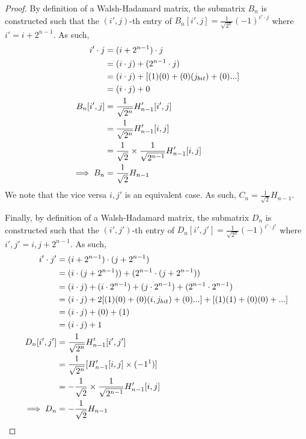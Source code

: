\documentclass[11pt]{article}
\theoremstyle{definition}
\theoremstyle{plain}
\theoremstyle{indented-remark}
\theoremstyle{indented-proof}
\begin{document}
\begin{proof}
\noindent By definition of a Walsh-Hadamard matrix, the submatrix $B_{n}$ is constructed such that the $(i',j)$-th entry of 
$B_{n}[i',j] = \frac{1}{\sqrt{2^{n}}}(-1)^{i' \cdot j}$ where $i' = i + 2^{n-1}$. As such,
\begin{align}
i' \cdot j &= (i + 2^{n-1}) \cdot j\notag \\
&= (i \cdot j) + (2^{n-1} \cdot j)\notag \\
&= (i \cdot j) + [(1)(0) + (0)(j_{bit}) + (0)...]\notag \\
&= (i \cdot j) + 0\notag \\
\newline
B_{n}[i',j] &= \frac{1}{\sqrt{2^{n}}}H'_{n-1}[i',j]\notag \\
&= \frac{1}{\sqrt{2^{n}}}H'_{n-1}[i,j]\notag \\
&= \frac{1}{\sqrt{2}} \times \frac{1}{\sqrt{2^{n-1}}}H'_{n-1}[i,j]\notag \\
\implies B_{n} &= \frac{1}{\sqrt{2}}H_{n-1}\notag
\end{align}
\noindent We note that the vice versa $i,j'$ is an equivalent case. As such, 
$C_{n} = \frac{1}{\sqrt{2}}H_{n-1}$. \newline

\noindent Finally, by definition of a Walsh-Hadamard matrix, the submatrix $D_{n}$ is constructed such that the $(i',j')$-th entry of 
$D_{n}[i',j'] = \frac{1}{\sqrt{2^{n}}}(-1)^{i' \cdot j'}$ where $i',j' = i,j + 2^{n-1}$. 
As such,
\begin{align}
i' \cdot j' &= (i + 2^{n-1}) \cdot (j + 2^{n-1})\notag \\
&= (i \cdot (j + 2^{n-1})) + (2^{n-1} \cdot (j + 2^{n-1}))\notag \\
&= (i \cdot j) + (i \cdot 2^{n-1}) + (j \cdot 2^{n-1}) + (2^{n-1} \cdot 2^{n-1})\notag \\
&= (i \cdot j) + 2[(1)(0) + (0)(i,j_{bit}) + (0)...] + [(1)(1) + (0)(0) + ...]\notag \\
&= (i \cdot j) + (0) + (1)\notag \\
&= (i \cdot j) + 1\notag \\
\newline
D_{n}[i',j'] &= \frac{1}{\sqrt{2^{n}}}H'_{n-1}[i',j']\notag \\
&= \frac{1}{\sqrt{2^{n}}}[H'_{n-1}[i,j] \times (-1^{1})]\notag \\
&= - \frac{1}{\sqrt{2}} \times \frac{1}{\sqrt{2^{n-1}}}H'_{n-1}[i,j]\notag \\
\implies D_{n} &= - \frac{1}{\sqrt{2}}H_{n-1}\notag
\end{align}


\end{proof}
\end{document}
